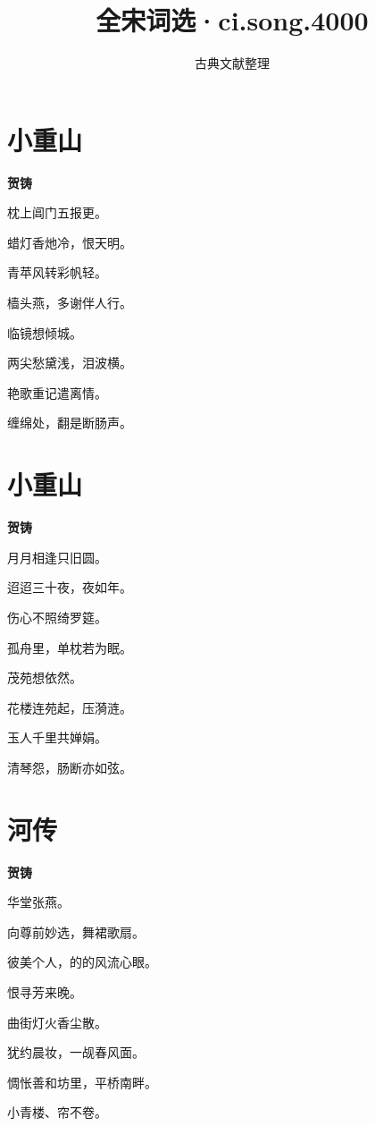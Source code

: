 \documentclass[12pt,a4paper]{ctexbook}
\title{全宋词选·ci.song.4000}
\author{古典文献整理}
\date{}
\begin{document}
\maketitle
\tableofcontents
\newpage
\section{小重山}
\textbf{贺铸}\par\vspace{0.5em}
枕上阊门五报更。\par
蜡灯香灺冷，恨天明。\par
青苹风转彩帆轻。\par
樯头燕，多谢伴人行。\par
临镜想倾城。\par
两尖愁黛浅，泪波横。\par
艳歌重记遣离情。\par
缠绵处，翻是断肠声。\par

\section{小重山}
\textbf{贺铸}\par\vspace{0.5em}
月月相逢只旧圆。\par
迢迢三十夜，夜如年。\par
伤心不照绮罗筵。\par
孤舟里，单枕若为眠。\par
茂苑想依然。\par
花楼连苑起，压漪涟。\par
玉人千里共婵娟。\par
清琴怨，肠断亦如弦。\par

\section{河传}
\textbf{贺铸}\par\vspace{0.5em}
华堂张燕。\par
向尊前妙选，舞裙歌扇。\par
彼美个人，的的风流心眼。\par
恨寻芳来晚。\par
曲街灯火香尘散。\par
犹约晨妆，一觇春风面。\par
惆怅善和坊里，平桥南畔。\par
小青楼、帘不卷。\par
\end{document}
